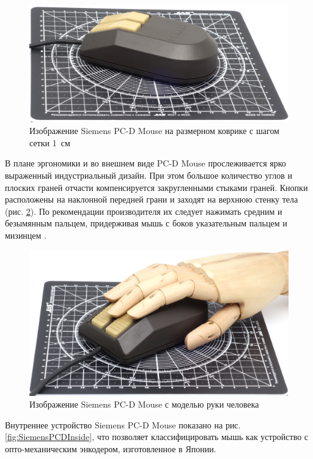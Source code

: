 \documentclass[11pt, a4paper]{article}
\begin{document}
\begin{figure}[h]
    \centering
    \includegraphics[scale=0.42]{1985_siemens_pcd_mouse/size_30.jpg}
    \caption{Изображение Siemens PC-D Mouse на размерном коврике с шагом сетки 1~см}
    \label{fig:SiemensPCDSize}
\end{figure}

В плане эргономики и во внешнем виде PC-D Mouse прослеживается ярко выраженный индустриальный дизайн. При этом большое количество углов и плоских граней отчасти компенсируется закругленными стыками граней. Кнопки расположены на наклонной передней грани и заходят на верхнюю стенку тела (рис. \ref{fig:SiemensPCDHand}). По рекомендации производителя их следует нажимать средним и безымянным пальцем, придерживая мышь с боков указательным пальцем и мизинцем \cite{manual}.

\begin{figure}[h]
    \centering
    \includegraphics[scale=0.42]{1985_siemens_pcd_mouse/hand_30.jpg}
    \caption{Изображение Siemens PC-D Mouse с моделью руки человека}
    \label{fig:SiemensPCDHand}
\end{figure}

Внутреннее устройство Siemens PC-D Mouse показано на рис. \ref{fig:SiemensPCDInside}, что позволяет классифицировать мышь как устройство с опто-механическим энкодером, изготовленное в Японии.
\end{document}
